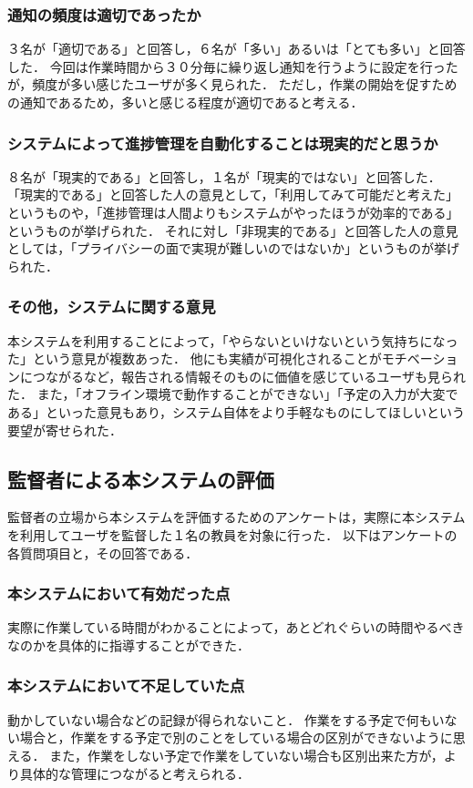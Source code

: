 \subsubsection{通知の頻度は適切であったか}
３名が「適切である」と回答し，６名が「多い」あるいは「とても多い」と回答した．
今回は作業時間から３０分毎に繰り返し通知を行うように設定を行ったが，頻度が多い感じたユーザが多く見られた．
ただし，作業の開始を促すための通知であるため，多いと感じる程度が適切であると考える．

\subsubsection{システムによって進捗管理を自動化することは現実的だと思うか}
８名が「現実的である」と回答し，１名が「現実的ではない」と回答した．
「現実的である」と回答した人の意見として，「利用してみて可能だと考えた」というものや，「進捗管理は人間よりもシステムがやったほうが効率的である」というものが挙げられた．
それに対し「非現実的である」と回答した人の意見としては，「プライバシーの面で実現が難しいのではないか」というものが挙げられた．

\subsubsection{その他，システムに関する意見}
本システムを利用することによって，「やらないといけないという気持ちになった」という意見が複数あった．
他にも実績が可視化されることがモチベーションにつながるなど，報告される情報そのものに価値を感じているユーザも見られた．
また，「オフライン環境で動作することができない」「予定の入力が大変である」といった意見もあり，システム自体をより手軽なものにしてほしいという要望が寄せられた．

\subsection{監督者による本システムの評価}
監督者の立場から本システムを評価するためのアンケートは，実際に本システムを利用してユーザを監督した１名の教員を対象に行った．
以下はアンケートの各質問項目と，その回答である．

\subsubsection{本システムにおいて有効だった点}
実際に作業している時間がわかることによって，あとどれぐらいの時間やるべきなのかを具体的に指導することができた．

\subsubsection{本システムにおいて不足していた点}
動かしていない場合などの記録が得られないこと．
作業をする予定で何もいない場合と，作業をする予定で別のことをしている場合の区別ができないように思える．
また，作業をしない予定で作業をしていない場合も区別出来た方が，より具体的な管理につながると考えられる．

